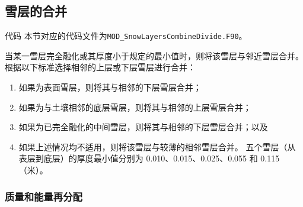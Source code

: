 \subsection{雪层的合并}
\begin{mymdframed}{代码}
本节对应的代码文件为\texttt{MOD\_SnowLayersCombineDivide.F90}。
\end{mymdframed}
当某一雪层完全融化或其厚度小于规定的最小值时，则将该雪层与邻近雪层合并。根据以下标准选择相邻的上层或下层雪层进行合并：
\begin{enumerate}
\item 如果为表面雪层，则将其与相邻的下层雪层合并；
\item 如果为与土壤相邻的底层雪层，则将其与相邻的上层雪层合并；
\item 如果为已完全融化的中间雪层，则将其与相邻的下层雪层合并；以及
\item 如果上述情况均不适用，则将该雪层与较薄的相邻雪层合并。
五个雪层（从表层到底层）的厚度最小值分别为 0.010、0.015、0.025、0.055 和 0.115（米）。

\end{enumerate}


\subsubsection{质量和能量再分配}

